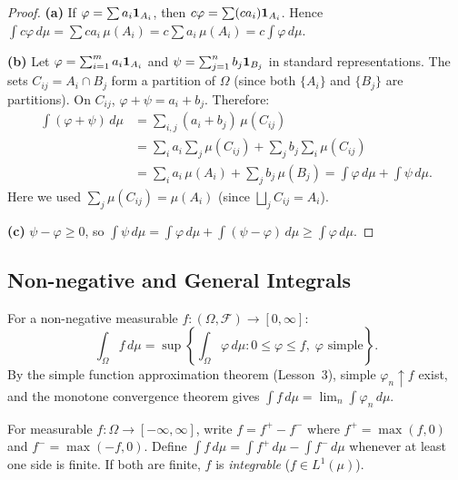 \documentclass[11pt,a4paper]{article}
\begin{document}
\begin{proof}
\textbf{(a)} If $\varphi = \sum a_i \mathbf{1}_{A_i}$, then
$c\varphi = \sum (ca_i) \mathbf{1}_{A_i}$. Hence
$\int c\varphi\, d\mu = \sum ca_i\, \mu(A_i)
= c \sum a_i\, \mu(A_i) = c \int \varphi\, d\mu$.

\textbf{(b)} Let $\varphi = \sum_{i=1}^m a_i \mathbf{1}_{A_i}$ and
$\psi = \sum_{j=1}^n b_j \mathbf{1}_{B_j}$ in standard representations.
The sets $C_{ij} = A_i \cap B_j$ form a partition of $\Omega$ (since both
$\{A_i\}$ and $\{B_j\}$ are partitions). On $C_{ij}$,
$\varphi + \psi = a_i + b_j$. Therefore:
\begin{align}
  \int (\varphi + \psi)\, d\mu
  &= \sum_{i,j} (a_i + b_j)\, \mu(C_{ij}) \nonumber\\
  &= \sum_i a_i \sum_j \mu(C_{ij}) + \sum_j b_j \sum_i \mu(C_{ij})
   \nonumber\\
  &= \sum_i a_i\, \mu(A_i) + \sum_j b_j\, \mu(B_j)
  = \int \varphi\, d\mu + \int \psi\, d\mu. \label{eq:simple_linearity}
\end{align}
Here we used $\sum_j \mu(C_{ij}) = \mu(A_i)$ (since
$\bigsqcup_j C_{ij} = A_i$).

\textbf{(c)} $\psi - \varphi \geq 0$, so
$\int \psi\, d\mu = \int \varphi\, d\mu + \int (\psi - \varphi)\, d\mu
\geq \int \varphi\, d\mu$.
\end{proof}

\subsection{Non-negative and General Integrals}
\label{subsec:integral_general}

\begin{definition}
\label{def:integral_nonneg}
For a non-negative measurable $f: (\Omega, \mathcal{F}) \to [0, \infty]$:
\begin{equation}
  \int_\Omega f\, d\mu
  = \sup\left\{\int_\Omega \varphi\, d\mu :
    0 \leq \varphi \leq f, \; \varphi \text{ simple}\right\}.
  \label{eq:integral_nonneg}
\end{equation}
By the simple function approximation theorem (Lesson~3), simple
$\varphi_n \uparrow f$ exist, and the monotone convergence theorem gives
$\int f\, d\mu = \lim_n \int \varphi_n\, d\mu$.
\end{definition}

\begin{definition}
\label{def:integral_general}
For measurable $f: \Omega \to [-\infty, \infty]$, write $f = f^+ - f^-$
where $f^+ = \max(f,0)$ and $f^- = \max(-f,0)$. Define
$\int f\, d\mu = \int f^+\, d\mu - \int f^-\, d\mu$ whenever at least one
side is finite. If both are finite, $f$ is \emph{integrable}
($f \in L^1(\mu)$).
\end{definition}
\end{document}

